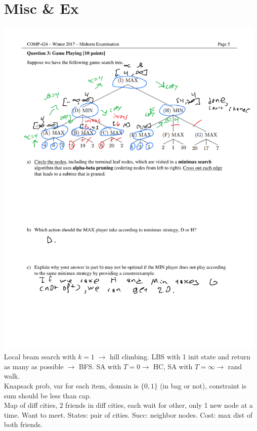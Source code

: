 \section{Misc \& Ex}
\includegraphics[width=.19\textwidth]{abprun.pdf}
\\ Local beam search with $k=1$ $\to$ hill climbing. LBS with 1 init
state and return as many as possible $\to$ BFS. SA with $T=0 \to $ HC,
SA with $T=\infty \to$ rand walk.
\\ Knapsack prob, var for each item, domain is $\{0,1\}$ (in bag or
not), constraint is sum should be less than cap.
\\ Map of diff cities, 2 friends in diff cities, each wait for other,
only 1 new node at a time. Want to meet. States: pair of cities. Succ:
neighbor nodes. Cost: max dist of both friends.
